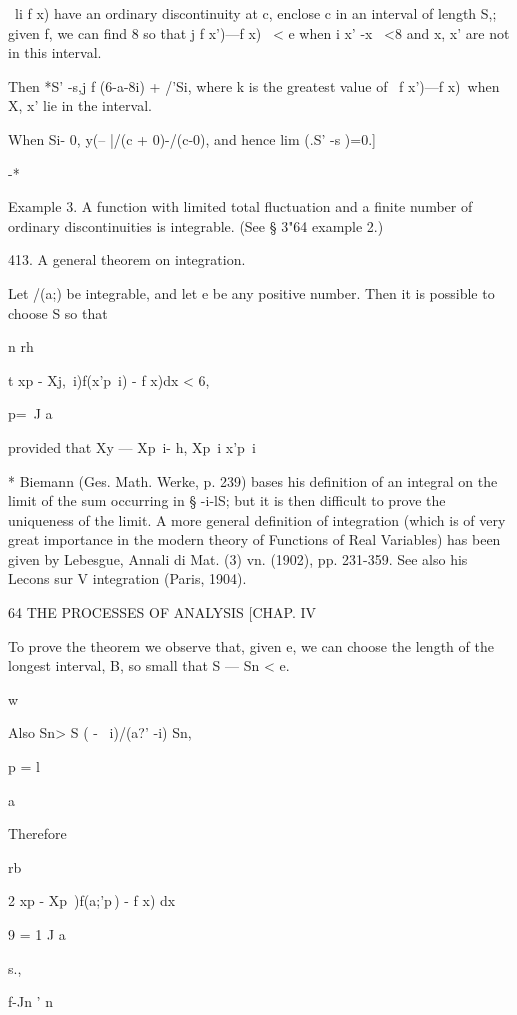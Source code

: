 \ li f x) have an ordinary discontinuity at c, enclose c in an
interval of length S,; given f, we can find 8 so that j f x')—f x) \
< e when i x' -x \ <8 and x, x' are not in this interval.

Then *S' -s,j f (6-a-8i) + /'Si, where k is the greatest value of \ f
x')—f x)\, when X, x' lie in the interval.

When Si- 0, y(-- |/(c + 0)-/(c-0), and hence lim (.S' -s )=0.]

 -*

Example 3. A function with limited total fluctuation and a finite
number of ordinary discontinuities is integrable. (See § 3"64 example
2.)

413. A general theorem on integration.

Let /(a;) be integrable, and let e be any positive number. Then it is
possible to choose S so that

n rh

t xp - Xj,\ i)f(x'p\ i) - f x)dx < 6,

p=\ J a

provided that Xy — Xp\ i- h, Xp\ i x'p\ i%

* Biemann (Ges. Math. Werke, p. 239) bases his definition of an
integral on the limit of the sum occurring in § -i-lS; but it is then
difficult to prove the uniqueness of the limit. A more general
definition of integration (which is of very great importance in the
modern theory of Functions of Real Variables) has been given by
Lebesgue, Annali di Mat. (3) vn. (1902), pp. 231-359. See also his
Lecons sur V integration (Paris, 1904).



64 THE PROCESSES OF ANALYSIS [CHAP. IV

To prove the theorem we observe that, given e, we can choose the
length of the longest interval, B, so small that S — Sn < e.

w

Also Sn> S ( - \ i)/(a?' -i) Sn,

p = l

  a

Therefore



  rb

2 xp - Xp\ )f(a;'p\,) - f x) dx

9 = 1 J a



 s.,



  f-Jn ' n



